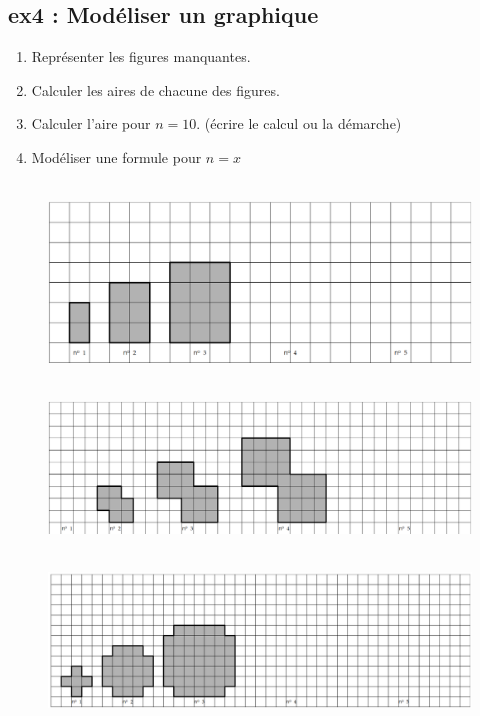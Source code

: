\documentclass[11pt]{article}
\newcommand{\Pointilles}[1][3]{%
  \multido{}{#1}{\makebox[\linewidth]{\dotfill}\\[\parskip]
}}
\begin{document}
\begin{multicols}{2}
  \subsection*{ex4 : Modéliser un graphique}
  \begin{enumerate}
  \item[1.] Représenter les figures manquantes.
  \item[2.] Calculer les aires de chacune des figures.
  \item[3.] Calculer l'aire pour $n = 10$. (écrire le calcul ou la démarche)
  \item[4.] Modéliser une formule pour $n = x$
\end{enumerate}
\end{multicols}

\begin{figure}[H]
      \centering
      \includegraphics[width=0.7\linewidth]{5x11-calcul-litteral/sources/geo-1.png}
\end{figure}

\Pointilles[4]

\begin{figure}[H]
      \centering
      \includegraphics[width=0.7\linewidth]{5x11-calcul-litteral/sources/geo-2.png}
\end{figure}

\Pointilles[4]

\begin{figure}[H]
      \centering
      \includegraphics[width=0.7\linewidth]{5x11-calcul-litteral/sources/geo-3.png}
\end{figure}

\Pointilles[4]
\end{document}
